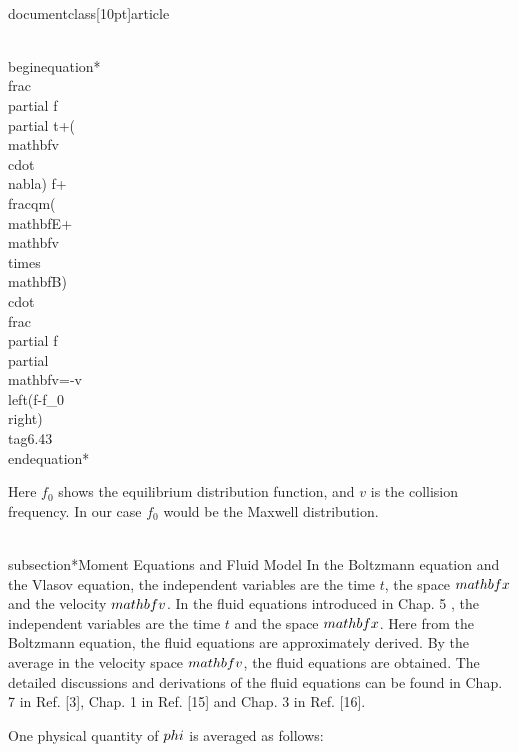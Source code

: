 \\documentclass[10pt]{article}
\begin{document}
{{{{\\begin{equation*}
\\frac{\\partial f}{\\partial t}+(\\mathbf{v} \\cdot \\nabla) f+\\frac{q}{m}(\\mathbf{E}+\\mathbf{v} \\times \\mathbf{B}) \\cdot \\frac{\\partial f}{\\partial \\mathbf{v}}=-v\\left(f-f_{0}\\right) \\tag{6.43}
\\end{equation*}


Here $f_{0}$ shows the equilibrium distribution function, and $v$ is the collision frequency. In our case $f_{0}$ would be the Maxwell distribution.

\\subsection*{Moment Equations and Fluid Model}
In the Boltzmann equation and the Vlasov equation, the independent variables are the time $t$, the space $\\mathbf{x}$ and the velocity $\\mathbf{v}$. In the fluid equations introduced in Chap. 5 , the independent variables are the time $t$ and the space $\\mathbf{x}$. Here from the Boltzmann equation, the fluid equations are approximately derived. By the average in the velocity space $\\mathbf{v}$, the fluid equations are obtained. The detailed discussions and derivations of the fluid equations can be found in Chap. 7 in Ref. [3], Chap. 1 in Ref. [15] and Chap. 3 in Ref. [16].

One physical quantity of $\\phi$ is averaged as follows:


}}}}
\end{document}
